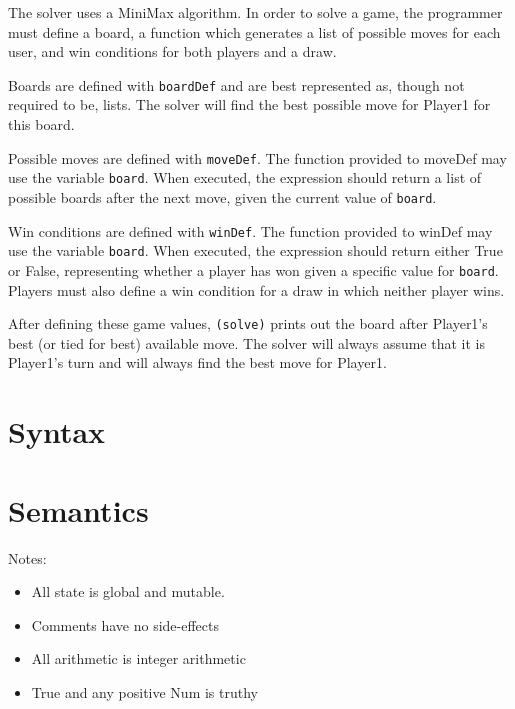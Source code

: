 \documentclass{article}
\begin{document}
The solver uses a MiniMax algorithm. In order to solve a game, the programmer must define a board, a function which generates a list of possible moves for each user, and win conditions for both players and a draw.

Boards are defined with \verb|boardDef| and are best represented as, though not required to be, lists. The solver will find the best possible move for Player1 for this board.

Possible moves are defined with \verb|moveDef|. The function provided to moveDef may use the variable \verb|board|. When executed, the expression should return a list of possible boards after the next move, given the current value of \verb|board|.

Win conditions are defined with \verb|winDef|. The function provided to winDef may use the variable \verb|board|. When executed, the expression should return either True or False, representing whether a player has won given a specific value for \verb|board|. Players must also define a win condition for a draw in which neither player wins.

After defining these game values, \verb|(solve)| prints out the board after Player1's best (or tied for best) available move. The solver will always assume that it is Player1's turn and will always find the best move for Player1.


\section{Syntax}



\section{Semantics}

Notes:
\begin{itemize}
\item  All state is global and mutable.
\item Comments have no side-effects
\item All arithmetic is integer arithmetic
\item True and any positive Num is truthy
\end{itemize}
\end{document}
